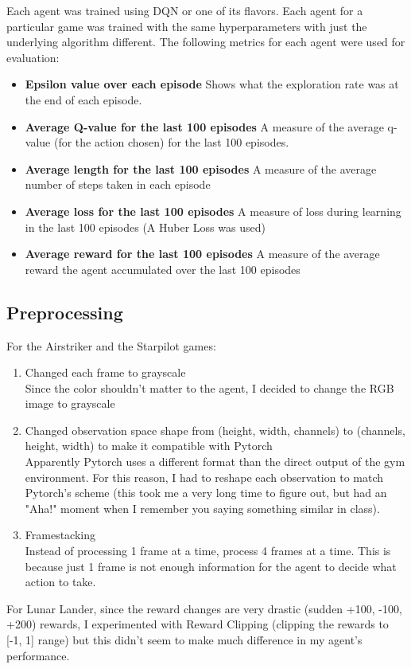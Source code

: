 \documentclass[paper=a4, fontsize=11pt, margin=1in]{scrartcl}
\numberwithin{equation}{section}		%
\numberwithin{figure}{section}			%
\numberwithin{table}{section}				%
\begin{document}
\begin{itemize}
Each agent was trained using DQN or one of its flavors. Each agent for a particular game was trained with the same hyperparameters with just the underlying algorithm different. The following metrics for each agent were used for evaluation:
\begin{itemize}
    \item \textbf{Epsilon value over each episode} Shows what the exploration rate was at the end of each episode.
    \item \textbf{Average Q-value for the last 100 episodes} A measure of the average q-value (for the action chosen) for the last 100 episodes.
    \item \textbf{Average length for the last 100 episodes} A measure of the average number of steps taken in each episode 
    \item \textbf{Average loss for the last 100 episodes} A measure of loss during learning in the last 100 episodes (A Huber Loss was used)
    \item \textbf{Average reward for the last 100 episodes} A measure of the average reward the agent accumulated over the last 100 episodes
\end{itemize}
\pagebreak

\subsection{Preprocessing}
For the Airstriker and the Starpilot games:
\begin{enumerate}
    \item Changed each frame to grayscale\\
    Since the color shouldn't matter to the agent, I decided to change the RGB image to grayscale
    \item Changed observation space shape from (height, width, channels) to (channels, height, width) to make it compatible with Pytorch\\ Apparently Pytorch uses a different format than the direct output of the gym environment. For this reason, I had to reshape each observation to match Pytorch's scheme (this took me a very long time to figure out, but had an "Aha!" moment when I remember you saying something similar in class).
    \item Framestacking\\
    Instead of processing 1 frame at a time, process 4 frames at a time. This is because just 1 frame is not enough information for the agent to decide what action to take.
\end{enumerate}

For Lunar Lander, since the reward changes are very drastic (sudden +100, -100, +200) rewards, I experimented with Reward Clipping (clipping the rewards to [-1, 1] range) but this didn't seem to make much difference in my agent's performance.

\end{itemize}
\end{document}
